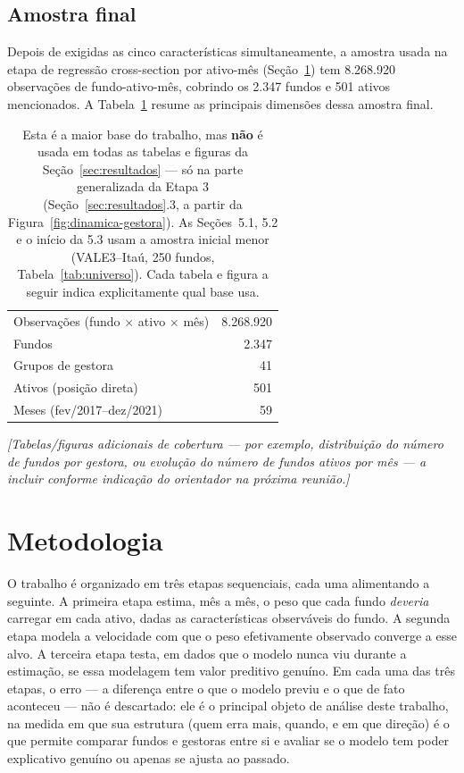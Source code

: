 \documentclass[11pt,a4paper]{article}
\begin{document}
\FloatBarrier
\subsection{Amostra final}

Depois de exigidas as cinco características simultaneamente, a amostra usada na etapa de
regressão cross-section por ativo-mês (Seção~\ref{sec:metodologia}) tem 8.268.920 observações
de fundo-ativo-mês, cobrindo os 2.347 fundos e 501 ativos mencionados. A Tabela~\ref{tab:amostra}
resume as principais dimensões dessa amostra final.

\begin{table}[h]\centering
\caption{Dimensões da amostra final (base multiativo --- todas as gestoras, todos os ativos).}
\label{tab:amostra}
\begin{tabular}{@{}lr@{}}
\toprule
Observações (fundo $\times$ ativo $\times$ mês) & 8.268.920 \\
Fundos & 2.347 \\
Grupos de gestora & 41 \\
Ativos (posição direta) & 501 \\
Meses (fev/2017--dez/2021) & 59 \\
\bottomrule
\end{tabular}
\caption*{\footnotesize Esta é a maior base do trabalho, mas \textbf{não} é usada em todas as
tabelas e figuras da Seção~\ref{sec:resultados} --- só na parte generalizada da Etapa 3
(Seção~\ref{sec:resultados}.3, a partir da Figura~\ref{fig:dinamica-gestora}). As Seções~5.1, 5.2
e o início da 5.3 usam a amostra inicial menor (VALE3--Itaú, 250 fundos, Tabela~\ref{tab:universo}).
Cada tabela e figura a seguir indica explicitamente qual base usa.}
\end{table}

\emph{[Tabelas/figuras adicionais de cobertura --- por exemplo, distribuição do número de
fundos por gestora, ou evolução do número de fundos ativos por mês --- a incluir conforme
indicação do orientador na próxima reunião.]}

\section{Metodologia}
\label{sec:metodologia}

O trabalho é organizado em três etapas sequenciais, cada uma alimentando a seguinte. A primeira
etapa estima, mês a mês, o peso que cada fundo \emph{deveria} carregar em cada ativo, dadas as
características observáveis do fundo. A segunda etapa modela a velocidade com que o peso
efetivamente observado converge a esse alvo. A terceira etapa testa, em dados que o modelo nunca
viu durante a estimação, se essa modelagem tem valor preditivo genuíno. Em cada uma das três
etapas, o erro --- a diferença entre o que o modelo previu e o que de fato aconteceu --- não é
descartado: ele é o principal objeto de análise deste trabalho, na medida em que sua estrutura
(quem erra mais, quando, e em que direção) é o que permite comparar fundos e gestoras entre si e
avaliar se o modelo tem poder explicativo genuíno ou apenas se ajusta ao passado.
\end{document}
